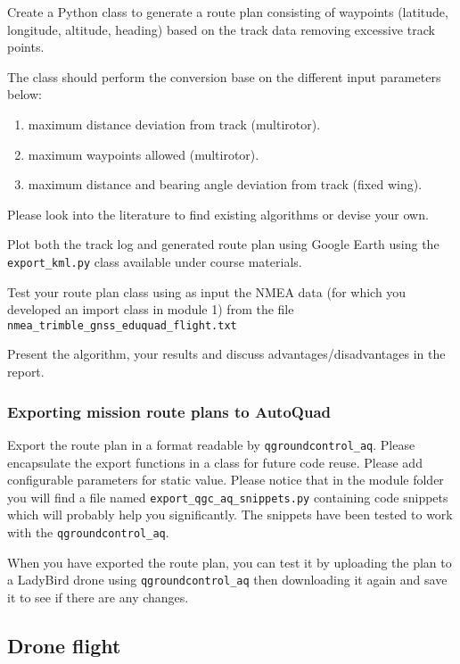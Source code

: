 \documentclass[a4paper,10pt,fleqn]{article}
\begin{document}
Create a Python class to generate a route plan consisting of waypoints (latitude, longitude, altitude, heading) based on the track data removing excessive track points.

The class should perform the conversion base on the different input parameters below: 
\begin{enumerate}
\item maximum distance deviation from track (multirotor).
\item maximum waypoints allowed (multirotor).
\item maximum distance and bearing angle deviation from track (fixed wing).
\end{enumerate}

Please look into the literature to find existing algorithms or devise your own.

Plot both the track log and generated route plan using Google Earth using the \texttt{export\_kml.py} class available under course materials.

Test your route plan class using as input the NMEA data (for which you developed an import class in module 1) from the file \texttt{nmea\_trimble\_gnss\_eduquad\_flight.txt}


Present the algorithm, your results and discuss advantages/disadvantages in the report. 

\subsubsection{Exporting mission route plans to AutoQuad}

Export the route plan in a format readable by \texttt{qgroundcontrol\_aq}. Please encapsulate the export functions in a class for future code reuse. Please add configurable parameters for static value. Please notice that in the module folder you will find a file named \texttt{export\_qgc\_aq\_snippets.py} containing code snippets which will probably help you significantly. The snippets have been tested to work with the \texttt{qgroundcontrol\_aq}.

When you have exported the route plan, you can test it by uploading the plan to a LadyBird drone using \texttt{qgroundcontrol\_aq} then downloading it again and save it to see if there are any changes.

\subsection{Drone flight}
\end{document}
